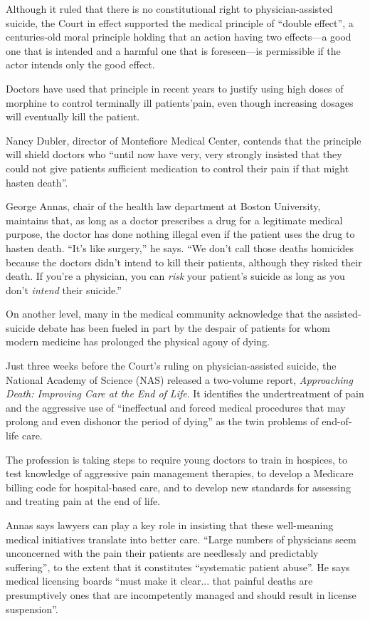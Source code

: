 Although it ruled that there is no constitutional right to
physician-assisted suicide, the Court in effect supported the medical
principle of ``double effect'', a centuries-old moral principle holding
that an action having two effects---a good one that is intended and a
harmful one that is foreseen---is permissible if the actor intends only
the good effect.

Doctors have used that principle in recent years to justify using high
doses of morphine to control terminally ill patients'pain, even though
increasing dosages will eventually kill the patient.

Nancy Dubler, director of Montefiore Medical Center, contends that the
principle will shield doctors who ``until now have very, very strongly
insisted that they could not give patients sufficient medication to
control their pain if that might hasten death''.

George Annas, chair of the health law department at Boston University,
maintains that, as long as a doctor prescribes a drug for a legitimate
medical purpose, the doctor has done nothing illegal even if the patient
uses the drug to hasten death. ``It's like surgery,'' he says. ``We
don't call those deaths homicides because the doctors didn't intend to
kill their patients, although they risked their death. If you're a
physician, you can \emph{risk} your patient's suicide as long as you
don't \emph{intend} their suicide.''

On another level, many in the medical community acknowledge that the
assisted-suicide debate has been fueled in part by the despair of
patients for whom modern medicine has prolonged the physical agony of
dying.

Just three weeks before the Court's ruling on physician-assisted
suicide, the National Academy of Science (NAS) released a two-volume
report, \emph{Approaching Death: Improving Care at the End of Life}. It
identifies the undertreatment of pain and the aggressive use of
``ineffectual and forced medical procedures that may prolong and even
dishonor the period of dying'' as the twin problems of end-of-life care.

The profession is taking steps to require young doctors to train in
hospices, to test knowledge of aggressive pain management therapies, to
develop a Medicare billing code for hospital-based care, and to develop
new standards for assessing and treating pain at the end of life.

Annas says lawyers can play a key role in insisting that these
well-meaning medical initiatives translate into better care. ``Large
numbers of physicians seem unconcerned with the pain their patients are
needlessly and predictably suffering'', to the extent that it
constitutes ``systematic patient abuse''. He says medical licensing
boards ``must make it clear... that painful deaths are presumptively ones
that are incompetently managed and should result in license
suspension''.

